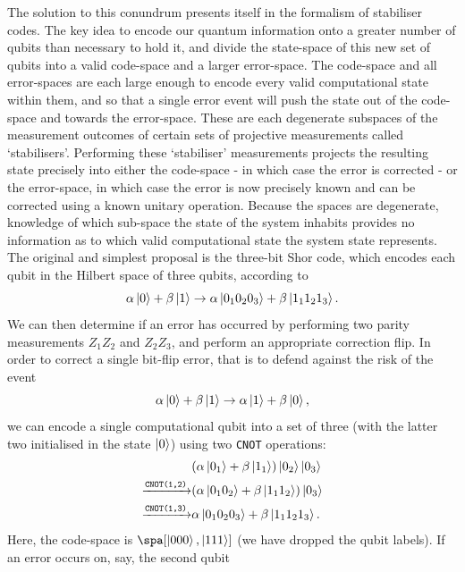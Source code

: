 \documentclass{report}
\begin{document}
The solution to this conundrum presents itself in the formalism of stabiliser codes. The key idea to encode our quantum information onto a greater number of qubits than necessary to hold it, and divide the state-space of this new set of qubits into a valid code-space and a larger error-space. The code-space and all error-spaces are each large enough to encode every valid computational state within them, and so that a single error event will push the state out of the code-space and towards the error-space. These are each degenerate subspaces of the measurement outcomes of certain sets of projective measurements called `stabilisers'. Performing these `stabiliser' measurements projects the resulting state precisely into either the code-space - in which case the error is corrected - or the error-space, in which case the error is now precisely known and can be corrected using a known unitary operation. Because the spaces are degenerate, knowledge of which sub-space the state of the system inhabits provides no information as to which valid computational state the system state represents. The original and simplest proposal is the three-bit Shor code, which encodes each qubit in the Hilbert space of three qubits, according to
\begin{equation*}
    \alpha\ket{0} + \beta\ket{1} \rightarrow \alpha\ket{0_10_20_3} + \beta\ket{1_11_21_3}.
\end{equation*} We can then determine if an error has occurred by performing two parity measurements $Z_1Z_2$ and $Z_2Z_3$, and perform an appropriate correction flip. In order to correct a single bit-flip error, that is to defend against the risk of the event
\begin{equation*}
    \alpha\ket{0} + \beta\ket{1} \rightarrow \alpha\ket{1} + \beta\ket{0},
\end{equation*}
we can encode a single computational qubit into a set of three (with the latter two initialised in the state $\ket{0}$) using two \texttt{CNOT} operations:
\begin{equation*}
\begin{aligned}
    & (\alpha\ket{0_1} + \beta\ket{1_1})\ket{0_2}\ket{0_3}\\
      \xrightarrow{\texttt{CNOT(1,2)}} &(\alpha\ket{0_1 0_2} + \beta\ket{1_1 1_2})\ket{0_3} \\
     \xrightarrow{\texttt{CNOT(1,3)}}  &\alpha\ket{0_1 0_2 0_3} + \beta\ket{1_1 1_2 1_3}.
\end{aligned}
\end{equation*}
Here, the code-space is $\spa[\ket{0 0 0}, \ket{1 1 1}]$ (we have dropped the qubit labels). If an error occurs on, say, the second qubit
\end{document}
